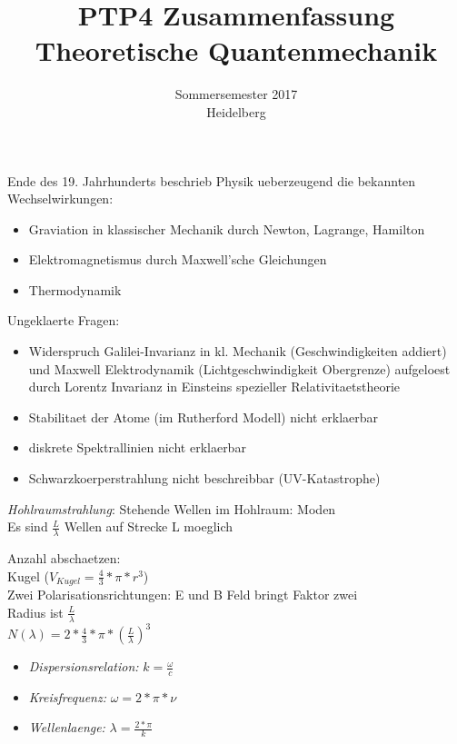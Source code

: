 \documentclass{article}
\begin{document}
\title{PTP4 Zusammenfassung \\ Theoretische Quantenmechanik}
\date{Sommersemester 2017\\Heidelberg}
\maketitle


Ende des 19. Jahrhunderts beschrieb Physik ueberzeugend die bekannten Wechselwirkungen:
\begin{itemize}
\item Graviation in klassischer Mechanik durch Newton, Lagrange, Hamilton
\item Elektromagnetismus durch Maxwell'sche Gleichungen
\item Thermodynamik
\end{itemize}

Ungeklaerte Fragen: 
\begin{itemize}
\item Widerspruch Galilei-Invarianz in kl. Mechanik (Geschwindigkeiten addiert) und Maxwell Elektrodynamik (Lichtgeschwindigkeit Obergrenze) aufgeloest durch Lorentz Invarianz in Einsteins spezieller Relativitaetstheorie
\item Stabilitaet der Atome (im Rutherford Modell) nicht erklaerbar
\item diskrete Spektrallinien nicht erklaerbar
\item Schwarzkoerperstrahlung nicht beschreibbar (UV-Katastrophe)
\end{itemize}

\emph{Hohlraumstrahlung}: 
Stehende Wellen im Hohlraum: Moden \\
Es sind $\frac{L}{\lambda}$ Wellen auf Strecke L moeglich


Anzahl abschaetzen: \\
Kugel ($V_{Kugel}=\frac{4}{3}*\pi*r^3$)\\
Zwei Polarisationsrichtungen: E und B Feld bringt Faktor zwei\\
Radius ist $\frac{L}{\lambda}$\\
$N(\lambda)  = 2*\frac{4}{3}*\pi*(\frac{L}{\lambda})^3$\\

\begin{itemize}
\item\emph{Dispersionsrelation:} $k = \frac{\omega}{c}$
\item\emph{Kreisfrequenz:} $\omega = 2*\pi*\nu$
\item\emph{Wellenlaenge:} $\lambda = \frac{2*\pi}{k}$
\end{itemize}
\end{document}
